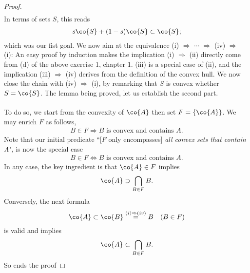 \begin{proof}
\begin{align}
\end{align}
%
In terms of sets $S$, this reads %
\begin{align}
  s\co{S} + (1-s)\co{S} \subset \co{S}; 
\end{align}
which was our fist goal. %
We now aim at the equivalence %
%
(i) $\Rightarrow$ $\cdots$ $\Rightarrow$ (iv) $\Rightarrow$ (i): %
%
An easy proof by induction makes the implication (i) $\Rightarrow$ (ii) %
directly come from (d) of the above exercise 1, chapter 1. %
%
(iii) is a special case of (ii),
and the implication (iii) $\Rightarrow$ (iv) derives from the definition of %
the convex hull. %
%
We now close the chain with (iv) $\Rightarrow$ (i), %
by remarking that $S$ is convex whether $S = \co{S}$. %
%  
The lemma being proved, let us establish the second part. \\
\\
To do so, we start from the convexity of $\co{A}$ then set %
%
  $F = \{\co{A}\}$. %
%
We may enrich $F$ as follows,  %
\begin{align}
  B \in F \Rightarrow B \text{ is convex and contains }A.
\end{align}
Note that our initial predicate %
``[$F$ only encompasses] \textit{all convex sets that contain A}", %
is now the special case %
%
\begin{align}
  B \in F \Leftrightarrow B \text{ is convex and contains }A.
\end{align}
%
In any case, the key ingredient is that $\co{A} \in F$ implies %
%
\begin{align}
 \co{A} \supset \bigcap_{B \in F} B.
\end{align}
%
Conversely, the next formula %
%
\begin{align}
  \co{A} \subset \co{B} \overset{(i) \Rightarrow (iv)}{=} B \quad (B \in F) 
\end{align}
%
is valid and implies %
\begin{align}
  \co{A} \subset \bigcap_{B \in F} B. 
\end{align}
%
So ends the proof
\end{proof}
